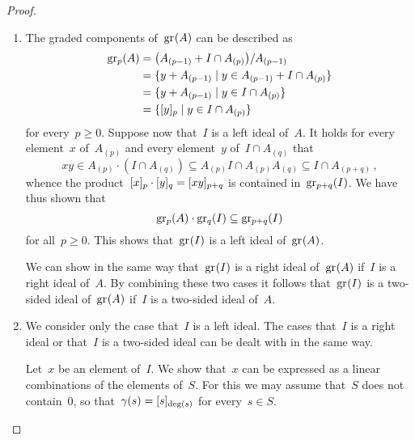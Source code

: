 \begin{proof}
	\leavevmode
	\begin{enumerate}
		\item
			The graded components of~$\gr(A)$ can be described as
			\begin{align*}
				\gr[p](A)
				&=
				\bigl( A_{(p-1)} + I \cap A_{(p)} \bigr) / A_{(p-1)}
				\\
				&=
				\{
					y + A_{(p-1)}
				\suchthat
					y \in A_{(p-1)} + I \cap A_{(p)}
				\}
				\\
				&=
				\{
					y + A_{(p-1)}
				\suchthat
					y \in I \cap A_{(p)}
				\}
				\\
				&=
				\{
					\fclass{ y }_{p}
				\suchthat
					y \in I \cap A_{(p)}
				\}
			\end{align*}
			for every~$p \geq 0$.
			Suppose now that~$I$ is a left ideal of~$A$.
			It holds for every element~$x$ of~$A_{(p)}$ and every element~$y$ of~$I \cap A_{(q)}$ that
			\[
				xy
				\in
				A_{(p)} \cdot (I \cap A_{(q)})
				\subseteq
				A_{(p)} I \cap A_{(p)} A_{(q)}
				\subseteq
				I \cap A_{(p+q)} \,,
			\]
			whence the product~$\lbrack x\rbrack_p \cdot \lbrack y\rbrack_q = \lbrack xy \rbrack_{p+q}$ is contained in~$\gr[p+q](I)$.
			We have thus shown that
			\[
				\gr[p](A) \cdot \gr[q](I)
				\subseteq
				\gr[p+q](I)
			\]
			for all~$p \geq 0$.
			This shows that~$\gr(I)$ is a left ideal of~$\gr(A)$.

			We can show in the same way that~$\gr(I)$ is a right ideal of~$\gr(A)$ if~$I$ is a right ideal of~$A$.
			By combining these two cases it follows that~$\gr(I)$ is a two-sided ideal of~$\gr(A)$ if~$I$ is a two-sided ideal of~$A$.
		\item
			We consider only the case that~$I$ is a left ideal.
			The cases that~$I$ is a right ideal or that~$I$ is a two-sided ideal can be dealt with in the same way.

			Let~$x$ be an element of~$I$.
			We show that~$x$ can be expressed as a linear combinations of the elements of~$S$.
			For this we may assume that~$S$ does not contain~$0$, so that~$\gamma(s) = \lbrack s\rbrack_{\deg(s)}$ for every~$s \in S$.


\end{enumerate}
\end{proof}
